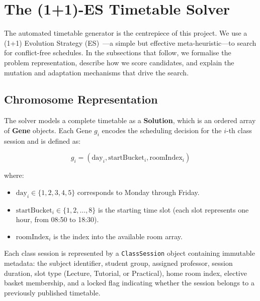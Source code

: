 
\section{The (1+1)-ES Timetable Solver}
\label{sec:solver}

The automated timetable generator is the centrepiece of this project. We use a (1+1) Evolution Strategy (ES)~\cite{rechenberg1973evolution,schwefel1995evolution}---a simple but effective meta-heuristic---to search for conflict-free schedules. In the subsections that follow, we formalise the problem representation, describe how we score candidates, and explain the mutation and adaptation mechanisms that drive the search.

\subsection{Chromosome Representation}

The solver models a complete timetable as a \textbf{Solution}, which is an ordered array of \textbf{Gene} objects. Each Gene $g_i$ encodes the scheduling decision for the $i$-th class session and is defined as:

\begin{equation}
    g_i = (\text{day}_i, \text{startBucket}_i, \text{roomIndex}_i)
\end{equation}

\noindent where:
\begin{itemize}
    \item $\text{day}_i \in \{1, 2, 3, 4, 5\}$ corresponds to Monday through Friday.
    \item $\text{startBucket}_i \in \{1, 2, \dots, 8\}$ is the starting time slot (each slot represents one hour, from 08:50 to 18:30).
    \item $\text{roomIndex}_i$ is the index into the available room array.
\end{itemize}

Each class session is represented by a \texttt{ClassSession} object containing immutable metadata: the subject identifier, student group, assigned professor, session duration, slot type (Lecture, Tutorial, or Practical), home room index, elective basket membership, and a locked flag indicating whether the session belongs to a previously published timetable.

